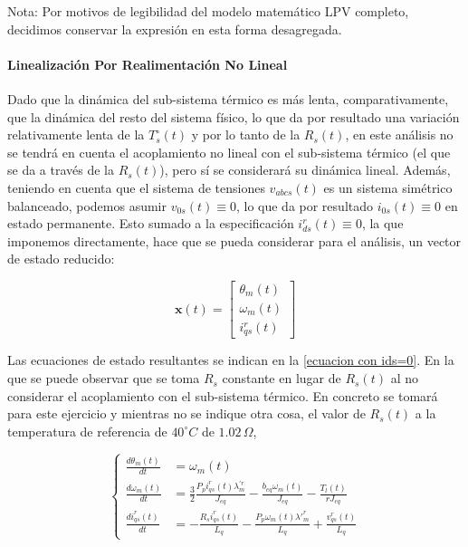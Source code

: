\documentclass[a4paper, 10pt, onecolumn,journal]{ieeeconf}
\begin{document}
Nota: Por motivos de legibilidad del modelo matemático LPV completo, decidimos conservar la expresión en esta forma desagregada.

\paragraph{\textbf{Linealización Por Realimentación No Lineal}}
Dado que la dinámica del sub-sistema térmico es
más lenta, comparativamente, que la dinámica del resto del sistema físico, lo que da por resultado
una variación relativamente lenta de la $T^{\circ}_s(t)$ y por lo tanto de la $R_s(t)$,
en este análisis no se tendrá en cuenta el acoplamiento no lineal con el sub-sistema térmico (el que se da a través de la $R_s(t)$), 
pero sí se considerará su dinámica lineal. Además, teniendo en cuenta que el sistema de tensiones $v_{abcs}(t)$ es un sistema
simétrico balanceado, podemos asumir $v_{0s}(t) \equiv 0$, lo que da por resultado $i_{0s}(t) \equiv 0$ en estado permanente. Esto sumado a la especificación $i^{r}_{ds}(t)\equiv0$, 
la que imponemos directamente, hace que se pueda considerar para el análisis, un vector de estado reducido:

\begin{equation}
    \mathbf{x}(t) = \begin{bmatrix} \theta_m(t) \\ \omega_m(t) \\ i^r_{qs}(t)\end{bmatrix}
    \label{vector de estado reducido}
\end{equation}

Las ecuaciones de estado resultantes se indican en la \cref{ecuacion con ids=0}.
En la que se puede observar que se toma $R_s$ constante en lugar  de $R_s(t)$ al
no considerar el acoplamiento con el sub-sistema térmico. En concreto
se tomará para este ejercicio y mientras no se indique otra cosa, el valor de 
$R_s(t)$ a la temperatura de referencia de $40^\circ C$ de $1.02 \, \Omega$, \cite{c1}%

\begin{equation}
	\begin{cases}
		\frac{d \theta_m(t)}{dt}  &= {\omega}_m(t)\\
		\frac{d \omega_m(t)}{dt}  &= \frac{3}{2} \frac{P_p i^r_{qs}(t)\lambda^{'r}_m}{J_{eq}} - \frac{b_{eq}\omega_m(t)}{J_{eq}} - \frac{T_l(t)}{r J_{eq}}\\
		\frac{d i^r_{qs}(t)}{dt}  &= -\frac{R_s i^r_{qs}(t)}{L_q} - \frac{P_p \omega_m(t) \lambda'^r_m}{L_q}+ \frac{v^r_{qs}(t)}{L_q}
    \end{cases}
	\label{ecuacion con ids=0}
\end{equation}
\end{document}

